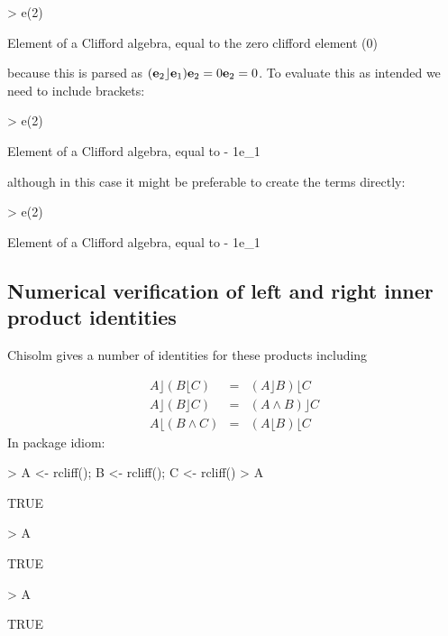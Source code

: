 \documentclass{birkjour}
\theoremstyle{definition}
\theoremstyle{remark}
\numberwithin{equation}{section}
\renewenvironment{Schunk}{\vspace{20pt}}{\vspace{20pt}}
\begin{document}
\begin{Schunk}
\begin{Sinput}
> e(2) %
\end{Sinput}
\begin{Soutput}
Element of a Clifford algebra, equal to
the zero clifford element (0)
\end{Soutput}
\end{Schunk}
%
because this is parsed as $({\bf e}_{2}\rfloor{\bf e}_{1}){\bf e}_{2}=0{\bf e}_{2}=0$.  To
evaluate this as intended we need to include brackets:

\begin{Schunk}
\begin{Sinput}
> e(2) %
\end{Sinput}
\begin{Soutput}
Element of a Clifford algebra, equal to
- 1e_1
\end{Soutput}
\end{Schunk}
%
although in this case it might be preferable to create the terms directly:

\begin{Schunk}
\begin{Sinput}
> e(2) %
\end{Sinput}
\begin{Soutput}
Element of a Clifford algebra, equal to
- 1e_1
\end{Soutput}
\end{Schunk}

\subsection{Numerical verification of left and right inner product identities}

Chisolm gives a number of identities for these products including

\begin{eqnarray}
  A\rfloor(B\lfloor C) &=& (A\rfloor B)\lfloor C\\
  A\rfloor(B\rfloor C) &=& (A\wedge B)\rfloor C\\
  A\lfloor(B\wedge  C) &=& (A\lfloor B)\lfloor C
\end{eqnarray}
%
In package idiom:

\begin{Schunk}
\begin{Sinput}
> A <- rcliff();  B <- rcliff();  C <- rcliff()
> A %
\end{Sinput}
\begin{Soutput}
[1] TRUE
\end{Soutput}
\begin{Sinput}
> A %
\end{Sinput}
\begin{Soutput}
[1] TRUE
\end{Soutput}
\begin{Sinput}
> A %
\end{Sinput}
\begin{Soutput}
[1] TRUE
\end{Soutput}
\end{Schunk}
\end{document}
